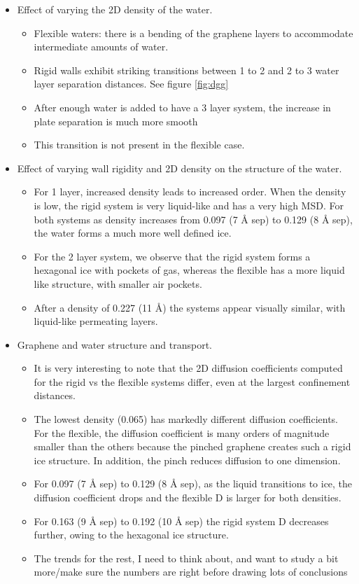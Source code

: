 \documentclass[12pt]{article}
\begin{document}
\begin{itemize}
	\item Effect of varying the 2D density of the water. 
	\begin{itemize}
		\item Flexible waters: there is a bending of the graphene layers to accommodate intermediate 
		         amounts of water.
		\item Rigid walls exhibit striking transitions between 1 to 2 and 2 to 3 water layer separation distances.
		         See figure \ref{fig:dgg}
		\item After enough water is added to have a 3 layer system, the increase in plate separation is much
			more smooth
		\item This transition is not present in the flexible case.
	\end{itemize}
	\item Effect of varying wall rigidity and 2D density on the structure of the water. 
	\begin{itemize}
		\item For 1 layer, increased density leads to increased order. When the density is low, the rigid system is 
		         very liquid-like and has a very high MSD. For both systems as density increases from 0.097 
		         (7 \r A sep) to 0.129 (8 \r A sep), the water forms a much more well defined ice.
		\item For the 2 layer system, we observe that the rigid system forms a hexagonal ice with pockets of gas, 
			whereas the flexible has a more liquid like structure, with smaller air pockets.
		\item After a density of 0.227 (11 \r A) the systems appear visually similar, with liquid-like permeating layers.
	\end{itemize}
	\item Graphene and water structure and transport. 
	\begin{itemize}
		\item It is very interesting to note that the 2D diffusion coefficients computed for the rigid vs the flexible 
			systems differ, even at the largest confinement distances. 
		\item The lowest density (0.065) has markedly different diffusion coefficients. For the flexible, the diffusion coefficient is many orders of magnitude smaller than the others because the pinched graphene creates such a rigid ice structure. In addition, the pinch reduces diffusion to one dimension.
		\item For 0.097 (7 \r A sep) to 0.129 (8 \r A sep), as the liquid transitions to ice, the diffusion coefficient drops and the flexible D is larger for both densities.
		\item For 0.163 (9 \r A sep) to 0.192 (10 \r A sep) the rigid system D decreases further, owing to the hexagonal ice structure.
		\item The trends for the rest, I need to think about, and want to study a bit more/make sure the numbers are right before drawing lots of conclusions
	\end{itemize}
\end{itemize}     
\end{document}

